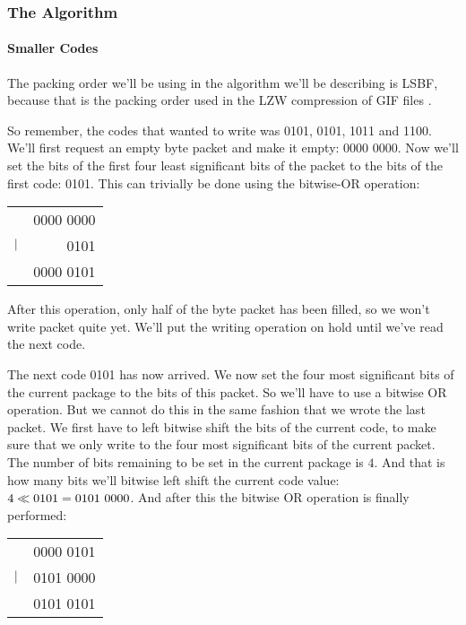 \subsubsection{The Algorithm}

\paragraph{Smaller Codes}

The packing order we'll be using in the algorithm we'll be describing is LSBF,
because that is the packing order used in the LZW compression of GIF
files \cite{gif89a}.

So remember, the codes that wanted to write was 0101, 0101, 1011 and
1100. We'll first request an empty byte packet and make it empty:
0000 0000. Now we'll set the bits of the first four least
significant bits of the packet to the bits of the first code:
0101. This can trivially be done using the bitwise-OR operation:

\begin{center}
  \begin{tabular}{lr}
    & 0000 0000  \\
    $\mathrel{|}$ & 0101 \\
    \hline
    & 0000 0101 \\
  \end{tabular}
\end{center}

After this operation, only half of the byte packet has been filled, so
we won't write packet quite yet. We'll put the writing operation on
hold until we've read the next code.

The next code 0101 has now arrived. We now set the four most
significant bits of the current package to the bits of this packet. So
we'll have to use a bitwise OR operation. But we cannot do this in the
same fashion that we wrote the last packet. We first have to left
bitwise shift the bits of the current code, to make sure that we only
write to the four most significant bits of the current packet. The
number of bits remaining to be set in the current package is $4$. And
that is how many bits we'll bitwise left shift the current code value:
$4 \ShiftLeft 0101 = 0101\ 0000$. And after this the bitwise OR
operation is finally performed:

\begin{center}
  \begin{tabular}{lr}
    & 0000 0101  \\
    $\mathrel{|}$ & 0101 0000 \\
    \hline
    & 0101 0101 \\
  \end{tabular}
\end{center}

